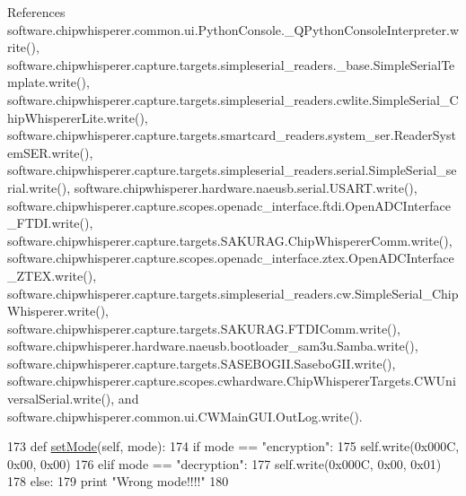 References software.\+chipwhisperer.\+common.\+ui.\+Python\+Console.\+\_\+\+Q\+Python\+Console\+Interpreter.\+write(), software.\+chipwhisperer.\+capture.\+targets.\+simpleserial\+\_\+readers.\+\_\+base.\+Simple\+Serial\+Template.\+write(), software.\+chipwhisperer.\+capture.\+targets.\+simpleserial\+\_\+readers.\+cwlite.\+Simple\+Serial\+\_\+\+Chip\+Whisperer\+Lite.\+write(), software.\+chipwhisperer.\+capture.\+targets.\+smartcard\+\_\+readers.\+system\+\_\+ser.\+Reader\+System\+S\+E\+R.\+write(), software.\+chipwhisperer.\+capture.\+targets.\+simpleserial\+\_\+readers.\+serial.\+Simple\+Serial\+\_\+serial.\+write(), software.\+chipwhisperer.\+hardware.\+naeusb.\+serial.\+U\+S\+A\+R\+T.\+write(), software.\+chipwhisperer.\+capture.\+scopes.\+openadc\+\_\+interface.\+ftdi.\+Open\+A\+D\+C\+Interface\+\_\+\+F\+T\+D\+I.\+write(), software.\+chipwhisperer.\+capture.\+targets.\+S\+A\+K\+U\+R\+A\+G.\+Chip\+Whisperer\+Comm.\+write(), software.\+chipwhisperer.\+capture.\+scopes.\+openadc\+\_\+interface.\+ztex.\+Open\+A\+D\+C\+Interface\+\_\+\+Z\+T\+E\+X.\+write(), software.\+chipwhisperer.\+capture.\+targets.\+simpleserial\+\_\+readers.\+cw.\+Simple\+Serial\+\_\+\+Chip\+Whisperer.\+write(), software.\+chipwhisperer.\+capture.\+targets.\+S\+A\+K\+U\+R\+A\+G.\+F\+T\+D\+I\+Comm.\+write(), software.\+chipwhisperer.\+hardware.\+naeusb.\+bootloader\+\_\+sam3u.\+Samba.\+write(), software.\+chipwhisperer.\+capture.\+targets.\+S\+A\+S\+E\+B\+O\+G\+I\+I.\+Sasebo\+G\+I\+I.\+write(), software.\+chipwhisperer.\+capture.\+scopes.\+cwhardware.\+Chip\+Whisperer\+Targets.\+C\+W\+Universal\+Serial.\+write(), and software.\+chipwhisperer.\+common.\+ui.\+C\+W\+Main\+G\+U\+I.\+Out\+Log.\+write().


\begin{DoxyCode}
173     \textcolor{keyword}{def }\hyperlink{classsoftware_1_1chipwhisperer_1_1capture_1_1targets_1_1SASEBOGII_1_1SaseboGIIAESRev1_ac648d5fca22671b3c4c46b875d0b9033}{setMode}(self, mode):
174         \textcolor{keywordflow}{if} mode == \textcolor{stringliteral}{"encryption"}:
175             self.write(0x000C, 0x00, 0x00)
176         \textcolor{keywordflow}{elif} mode == \textcolor{stringliteral}{"decryption"}:
177             self.write(0x000C, 0x00, 0x01)
178         \textcolor{keywordflow}{else}:
179             \textcolor{keywordflow}{print} \textcolor{stringliteral}{"Wrong mode!!!!"}
180 
\end{DoxyCode}
\hypertarget{classsoftware_1_1chipwhisperer_1_1capture_1_1targets_1_1SASEBOGII_1_1SaseboGIIAESRev1_a9c1995aad6eb3e5c3238aba21ead6a73}{}
